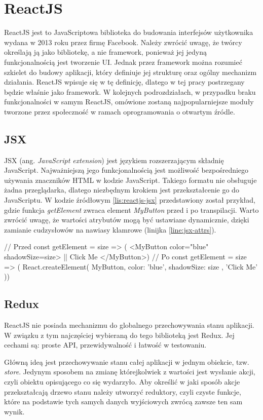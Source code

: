 \section{ReactJS}
	 ReactJS jest to JavaScriptowa biblioteka do budowania interfejsów użytkownika wydana w 2013 roku przez firmę Facebook. Należy zwrócić uwagę, że twórcy określają ją jako bibliotekę, a nie framework, ponieważ jej jedyną funkcjonalnością jest tworzenie UI. Jednak przez framework można rozumieć szkielet do budowy aplikacji, który definiuje jej strukturę oraz ogólny mechanizm działania. ReactJS wpisuje się w tę definicję, dlatego w tej pracy postrzegany będzie właśnie jako framework. W kolejnych podrozdziałach, w przypadku braku funkcjonalności w samym ReactJS, omówione zostaną najpopularniejsze moduły tworzone przez społeczność w ramach oprogramowania o otwartym źródle.
	 
	 \subsection{JSX}
	 JSX (ang. \textit{JavaScript extension}) jest językiem rozszerzającym składnię JavaScript. Najważniejszą jego funkcjonalnością jest możliwość bezpośredniego używania znaczników HTML w kodzie JavaScript. Takiego formatu nie obsługuje żadna przeglądarka, dlatego niezbędnym krokiem jest przekształcenie go do JavaScriptu. W kodzie źródłowym \ref{lis:reactjs-jsx} przedstawiony został przykład, gdzie funkcja \textit{getElement} zwraca element \textit{MyButton} przed i po transpilacji. Warto zwrócić uwagę, że wartości atrybutów mogą być ustawiane dynamicznie, dzięki zamianie cudzysłowów na nawiasy klamrowe (linijka \ref{line:jsx-attrs}).
	  
	 \begin{code}[
		language=javascript,
		caption={Przykład użycia JSX (źródło: \cite{reactjs-jsx})},
		label={lis:reactjs-jsx},
		escapechar=|
	]
// Przed
const getElement = size => (
  <MyButton color="blue" shadowSize={size}> |\label{line:jsx-attrs}|
    Click Me
  </MyButton>)
// Po
const getElement = size => (
  React.createElement(
    MyButton,
    { color: 'blue', shadowSize: size },
    'Click Me'
  ))
	\end{code}
	
	 \subsection{Redux}
	 ReactJS nie posiada mechanizmu do globalnego przechowywania stanu aplikacji. W związku z tym najczęściej wybieraną do tego biblioteką jest Redux. Jej cechami są: proste API, przewidywalność i łatwość w testowaniu.\par
	 Główną ideą jest przechowywanie stanu całej aplikacji w jednym obiekcie, tzw. \textit{store}. Jedynym sposobem na zmianę którejkolwiek z wartości jest wysłanie akcji, czyli obiektu opisującego co się wydarzyło. Aby określić w jaki sposób akcje przekształcają drzewo stanu należy utworzyć reduktory, czyli czyste funkcje, które na podstawie tych samych danych wyjściowych zwrócą zawsze ten sam wynik.
	 
